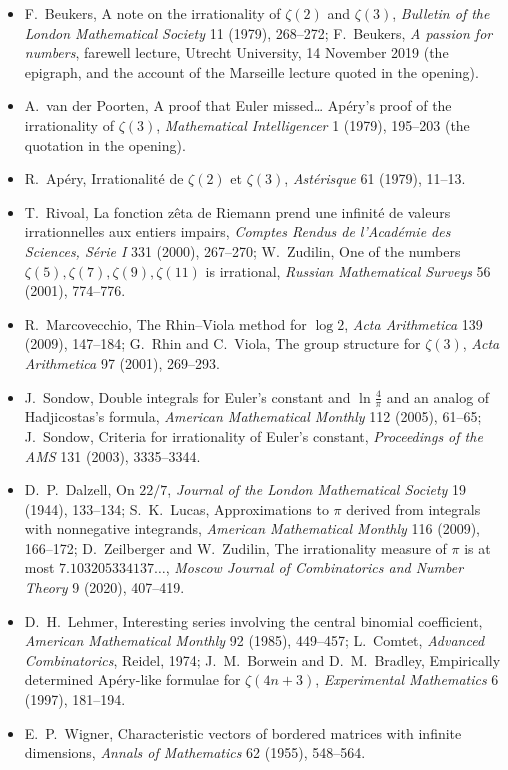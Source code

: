\begin{itemize}
\item F.~Beukers, A note on the irrationality of $\zeta(2)$ and $\zeta(3)$, \emph{Bulletin of the London Mathematical Society} 11 (1979),
268--272; F.~Beukers, \emph{A passion for numbers}, farewell lecture, Utrecht University, 14 November 2019 (the epigraph, and the account
of the Marseille lecture quoted in the opening).
\item A.~van der Poorten, A proof that Euler missed\dots{} Apéry's proof of the irrationality of $\zeta(3)$, \emph{Mathematical Intelligencer}
1 (1979), 195--203 (the quotation in the opening).
\item R.~Apéry, Irrationalité de $\zeta(2)$ et $\zeta(3)$, \emph{Astérisque} 61 (1979), 11--13.
\item T.~Rivoal, La fonction zêta de Riemann prend une infinité de valeurs irrationnelles aux entiers impairs, \emph{Comptes Rendus de
l'Académie des Sciences, Série I} 331 (2000), 267--270; W.~Zudilin, One of the numbers $\zeta(5),\zeta(7),\zeta(9),\zeta(11)$ is irrational,
\emph{Russian Mathematical Surveys} 56 (2001), 774--776.
\item R.~Marcovecchio, The Rhin--Viola method for $\log2$, \emph{Acta Arithmetica} 139 (2009), 147--184; G.~Rhin and C.~Viola, The group
structure for $\zeta(3)$, \emph{Acta Arithmetica} 97 (2001), 269--293.
\item J.~Sondow, Double integrals for Euler's constant and $\ln\frac4\pi$ and an analog of Hadjicostas's formula, \emph{American
Mathematical Monthly} 112 (2005), 61--65; J.~Sondow, Criteria for irrationality of Euler's constant, \emph{Proceedings of the AMS} 131 (2003),
3335--3344.
\item D.~P.~Dalzell, On $22/7$, \emph{Journal of the London Mathematical Society} 19 (1944), 133--134; S.~K.~Lucas, Approximations to $\pi$
derived from integrals with nonnegative integrands, \emph{American Mathematical Monthly} 116 (2009), 166--172; D.~Zeilberger and
W.~Zudilin, The irrationality measure of $\pi$ is at most $7.103205334137\ldots$, \emph{Moscow Journal of Combinatorics and Number
Theory} 9 (2020), 407--419.
\item D.~H.~Lehmer, Interesting series involving the central binomial coefficient, \emph{American Mathematical Monthly} 92 (1985),
449--457; L.~Comtet, \emph{Advanced Combinatorics}, Reidel, 1974; J.~M.~Borwein and D.~M.~Bradley, Empirically determined Apéry-like
formulae for $\zeta(4n+3)$, \emph{Experimental Mathematics} 6 (1997), 181--194.
\item E.~P.~Wigner, Characteristic vectors of bordered matrices with infinite dimensions, \emph{Annals of Mathematics} 62 (1955), 548--564.

\end{itemize}
